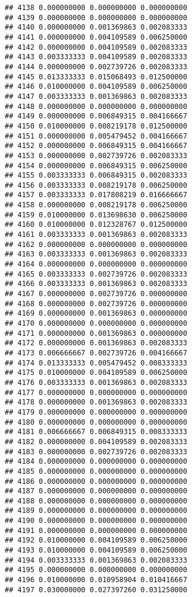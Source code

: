 \documentclass[
]{article}
\begin{document}
\begin{verbatim}
## 4138 0.000000000 0.000000000 0.000000000
## 4139 0.000000000 0.000000000 0.000000000
## 4140 0.000000000 0.001369863 0.002083333
## 4141 0.000000000 0.004109589 0.006250000
## 4142 0.000000000 0.004109589 0.002083333
## 4143 0.003333333 0.004109589 0.002083333
## 4144 0.000000000 0.002739726 0.002083333
## 4145 0.013333333 0.015068493 0.012500000
## 4146 0.010000000 0.004109589 0.006250000
## 4147 0.003333333 0.001369863 0.002083333
## 4148 0.000000000 0.000000000 0.000000000
## 4149 0.000000000 0.006849315 0.004166667
## 4150 0.010000000 0.008219178 0.012500000
## 4151 0.000000000 0.005479452 0.004166667
## 4152 0.000000000 0.006849315 0.004166667
## 4153 0.000000000 0.002739726 0.002083333
## 4154 0.000000000 0.006849315 0.006250000
## 4155 0.003333333 0.006849315 0.002083333
## 4156 0.003333333 0.008219178 0.006250000
## 4157 0.003333333 0.017808219 0.016666667
## 4158 0.000000000 0.008219178 0.006250000
## 4159 0.010000000 0.013698630 0.006250000
## 4160 0.010000000 0.012328767 0.012500000
## 4161 0.003333333 0.001369863 0.002083333
## 4162 0.000000000 0.000000000 0.000000000
## 4163 0.003333333 0.001369863 0.002083333
## 4164 0.000000000 0.000000000 0.000000000
## 4165 0.003333333 0.002739726 0.002083333
## 4166 0.003333333 0.001369863 0.002083333
## 4167 0.000000000 0.002739726 0.000000000
## 4168 0.000000000 0.002739726 0.000000000
## 4169 0.000000000 0.001369863 0.000000000
## 4170 0.000000000 0.000000000 0.000000000
## 4171 0.000000000 0.001369863 0.000000000
## 4172 0.000000000 0.001369863 0.002083333
## 4173 0.006666667 0.002739726 0.004166667
## 4174 0.013333333 0.005479452 0.008333333
## 4175 0.010000000 0.004109589 0.006250000
## 4176 0.003333333 0.001369863 0.002083333
## 4177 0.000000000 0.000000000 0.000000000
## 4178 0.000000000 0.001369863 0.002083333
## 4179 0.000000000 0.000000000 0.000000000
## 4180 0.000000000 0.000000000 0.000000000
## 4181 0.006666667 0.006849315 0.008333333
## 4182 0.000000000 0.004109589 0.002083333
## 4183 0.000000000 0.002739726 0.002083333
## 4184 0.000000000 0.000000000 0.000000000
## 4185 0.000000000 0.000000000 0.000000000
## 4186 0.000000000 0.000000000 0.000000000
## 4187 0.000000000 0.000000000 0.000000000
## 4188 0.000000000 0.000000000 0.000000000
## 4189 0.000000000 0.000000000 0.000000000
## 4190 0.000000000 0.000000000 0.000000000
## 4191 0.000000000 0.000000000 0.000000000
## 4192 0.010000000 0.004109589 0.006250000
## 4193 0.010000000 0.004109589 0.006250000
## 4194 0.003333333 0.001369863 0.002083333
## 4195 0.000000000 0.000000000 0.000000000
## 4196 0.010000000 0.010958904 0.010416667
## 4197 0.030000000 0.027397260 0.031250000

\end{verbatim}
\end{document}
